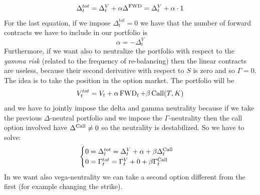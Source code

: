 \begin{equation}
    \Delta_t^{tot} = \Delta_t^V + \alpha\Delta^{\operatorname{FWD}} = \Delta_t^V + \alpha\cdot 1
\end{equation}
For the last equation, if we impose $\Delta_t^{tot}=0$ we have that the number of forward contracts we have to include in our portfolio is
\begin{equation}
    \alpha = -\Delta^V_t
\end{equation}
Furthermore, if we want also to neutralize the portfolio with respect to the \emph{gamma risk} (related to the frequency of re-balancing) then the linear contracts are useless, because their second derivative with respect to $S$ is zero and so $\Gamma=0$. The idea is to take the position in the option market. The portfolio will be
\begin{equation}
    V^{tot}_t = V_t + \alpha\operatorname{FWD}_t + \beta \operatorname{Call}(T,K)
\end{equation}
and we have to jointly impose the delta and gamma neutrality because if we take the previous $\Delta$-neutral portfolio and we impose the $\Gamma$-neutrality then the call option involved have $\Delta^{\operatorname{Call}}\ne0$ so the neutrality is destabilized. So we have to solve:
\begin{equation}
    \begin{cases}
    0 = \Delta^{tot}_t = \Delta_t^V + \alpha + \beta\Delta^{\operatorname{Call}}_t \\
    0 = \Gamma^{tot}_t = \Gamma^V_t + 0 + \beta \Gamma^{\operatorname{Call}}_t
    \end{cases}
\end{equation}
In we want also vega-neutrality we can take a second option different from the first (for example changing the strike).